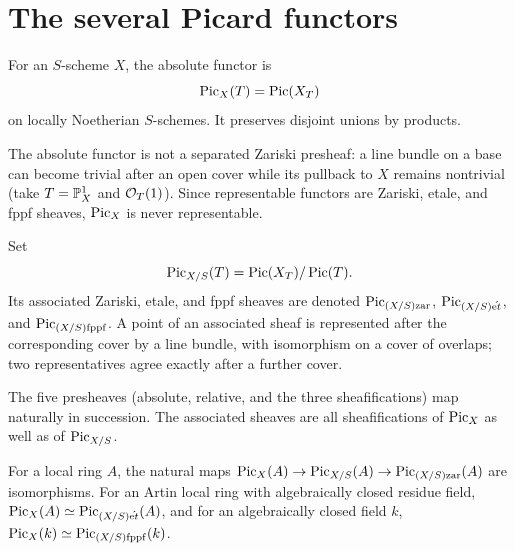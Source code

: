 \section{The several Picard functors}\label{kps-sec-functors}

\begin{definition}\label{kps-def-absolute}
For an $S$-scheme $X$, the absolute functor is
\[\operatorname{Pic}_X(T)=\operatorname{Pic}(X_T)\]
on locally Noetherian $S$-schemes. It preserves disjoint unions by products.
\end{definition}

The absolute functor is not a separated Zariski presheaf: a line bundle on a
base can become trivial after an open cover while its pullback to $X$ remains
nontrivial (take $T=\mathbb P^1_X$ and $\mathcal O_T(1)$). Since representable functors are
Zariski, etale, and fppf sheaves, $\operatorname{Pic}_X$ is never representable.

\begin{definition}\label{kps-def-relative}
Set
\[\operatorname{Pic}_{X/S}(T)=\operatorname{Pic}(X_T)/\operatorname{Pic}(T).\]
Its associated Zariski, etale, and fppf sheaves are denoted
$\operatorname{Pic}_{(X/S)\mathrm{zar}}$, $\operatorname{Pic}_{(X/S)\acute{\mathrm{e}t}}$, and
$\operatorname{Pic}_{(X/S)\mathrm{fppf}}$. A point of an associated sheaf is represented
after the corresponding cover by a line bundle, with isomorphism on a cover
of overlaps; two representatives agree exactly after a further cover.
\end{definition}

\begin{remark}\label{kps-rmk-local-comparisons}
The five presheaves (absolute, relative, and the three sheafifications) map
naturally in succession. The associated sheaves are all sheafifications of
$\operatorname{Pic}_X$ as well as of $\operatorname{Pic}_{X/S}$.
\end{remark}

\begin{remark}\label{kps-ex-local-bases}
For a local ring $A$, the natural maps
$\operatorname{Pic}_X(A)\to\operatorname{Pic}_{X/S}(A)\to\operatorname{Pic}_{(X/S)\mathrm{zar}}(A)$ are
isomorphisms. For an Artin local ring with algebraically closed residue field,
$\operatorname{Pic}_X(A)\simeq\operatorname{Pic}_{(X/S)\acute{\mathrm{e}t}}(A)$, and for an algebraically closed field
$k$, $\operatorname{Pic}_X(k)\simeq\operatorname{Pic}_{(X/S)\mathrm{fppf}}(k)$.
\end{remark}

